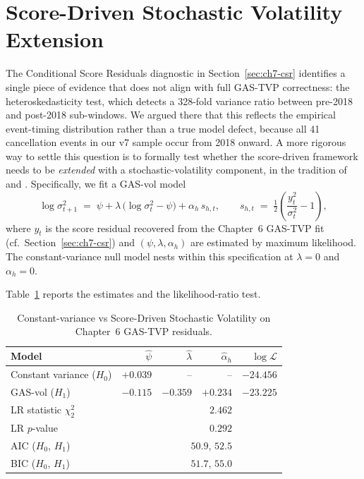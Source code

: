 \section{Score-Driven Stochastic Volatility Extension}
\label{sec:ch7-sv}

The Conditional Score Residuals diagnostic in Section~\ref{sec:ch7-csr} identifies a single piece of evidence that does not align with full GAS-TVP correctness: the heteroskedasticity test, which detects a 328-fold variance ratio between pre-2018 and post-2018 sub-windows. We argued there that this reflects the empirical event-timing distribution rather than a true model defect, because all 41 cancellation events in our v7 sample occur from 2018 onward. A more rigorous way to settle this question is to formally test whether the score-driven framework needs to be \emph{extended} with a stochastic-volatility component, in the tradition of \cite{harvey2008beta} and \cite{creal2013generalized}. Specifically, we fit a GAS-vol model
$$
\log\sigma^2_{t+1} \;=\; \psi + \lambda\,\big(\log\sigma^2_t - \psi\big) + \alpha_h\,s_{h,t}, \qquad s_{h,t} \;=\; \tfrac{1}{2}\!\left(\frac{y_t^2}{\sigma^2_t} - 1\right),
$$
where $y_t$ is the score residual recovered from the Chapter~6 GAS-TVP fit (cf.\ Section~\ref{sec:ch7-csr}) and $(\psi, \lambda, \alpha_h)$ are estimated by maximum likelihood. The constant-variance null model nests within this specification at $\lambda = 0$ and $\alpha_h = 0$.

Table~\ref{tab:ch7-sv} reports the estimates and the likelihood-ratio test.

\begin{table}[ht]
\centering
\caption{Constant-variance vs Score-Driven Stochastic Volatility on Chapter~6 GAS-TVP residuals.}
\label{tab:ch7-sv}
\begin{tabular}{lrrrr}
\toprule
Model & $\hat\psi$ & $\hat\lambda$ & $\hat\alpha_h$ & $\log\mathcal L$ \\
\midrule
Constant variance ($H_0$)         & $+0.039$ & --      & --      & $-24.456$ \\
GAS-vol ($H_1$)                    & $-0.115$ & $-0.359$ & $+0.234$ & $-23.225$ \\
\midrule
LR statistic $\chi^2_{2}$         & \multicolumn{3}{r}{$2.462$} & \\
LR $p$-value                       & \multicolumn{3}{r}{$0.292$} & \\
AIC ($H_0$, $H_1$)                 & \multicolumn{3}{r}{$50.9$, $52.5$} & \\
BIC ($H_0$, $H_1$)                 & \multicolumn{3}{r}{$51.7$, $55.0$} & \\
\bottomrule
\end{tabular}
\end{table}

